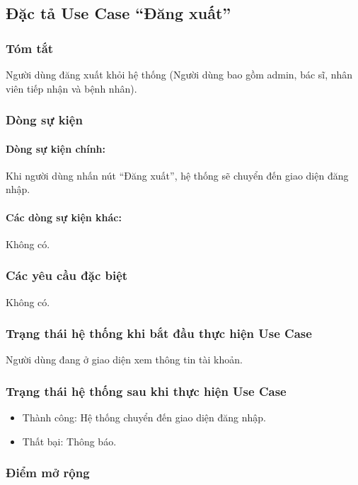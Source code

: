 \subsection{Đặc tả Use Case ``Đăng xuất''}

\subsubsection{Tóm tắt}
Người dùng đăng xuất khỏi hệ thống (Người dùng bao gồm admin, bác sĩ, nhân viên tiếp nhận và bệnh nhân).

\subsubsection{Dòng sự kiện}
\paragraph{\textbf{Dòng sự kiện chính:}}
Khi người dùng nhấn nút ``Đăng xuất'', hệ thống sẽ chuyển đến giao diện đăng nhập.

\paragraph{\textbf{Các dòng sự kiện khác:}}
Không có.

\subsubsection{Các yêu cầu đặc biệt}
Không có.

\subsubsection{Trạng thái hệ thống khi bắt đầu thực hiện Use Case}
Người dùng đang ở giao diện xem thông tin tài khoản.

\subsubsection{Trạng thái hệ thống sau khi thực hiện Use Case}
\begin{itemize}
  \item Thành công: Hệ thống chuyển đến giao diện đăng nhập.
  \item Thất bại: Thông báo.
\end{itemize}

\subsubsection{Điểm mở rộng}